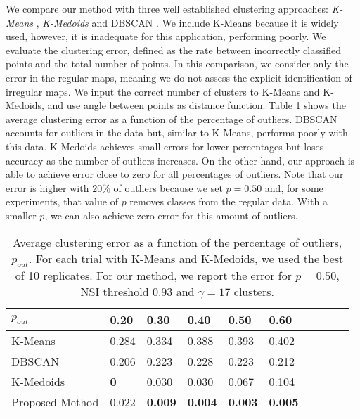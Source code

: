 We compare our method with three well established clustering approaches: \emph{K-Means} \cite{lloyd1982least}, \emph{K-Medoids} \cite{kaufman1987clustering} and DBSCAN \cite{ester1996density}. 
We include K-Means because it is widely used, however, it is inadequate for this application, performing poorly.
We evaluate the clustering error, defined as the rate between incorrectly classified points and the total number of points. In this comparison, we consider only the error in the regular maps, meaning we do not assess the explicit identification of irregular maps. 
We input the correct number of clusters to K-Means and K-Medoids, and use angle between points as distance function.
%
Table \ref{tab:ec} shows the average clustering error as a function of the percentage of outliers. DBSCAN accounts for outliers in the data but, similar to K-Means, performs poorly with this data. K-Medoids achieves small errors for lower percentages but loses accuracy as the number of outliers increases.
On the other hand, our approach is able to achieve error close to zero for all percentages of outliers. Note that our error is higher with $20\%$ of outliers because we set $p=0.50$ and, for some experiments, that value of $p$ removes classes from the regular data. With a smaller $p$, we can also achieve zero error for this amount of outliers.
%
\begin{table}[hbt]
\caption{Average clustering error as a function of the percentage of outliers, $p_{out}$. For each trial with K-Means and K-Medoids, we used the best of 10 replicates. For our method, we report the error for $p=0.50$, NSI threshold $0.93$ and $\gamma = 17$ clusters.}
\label{tab:ec}
\centering
\begin{tabular}{llllllllll}
\toprule
$p_{out}$& 0.20&0.30&0.40&0.50&0.60\\
\midrule
K-Means &0.284&0.334&0.388&0.393&0.402\\
DBSCAN&0.206&0.223&0.228&0.223&0.212\\
K-Medoids&\textbf{0}&0.030&0.030&0.067&0.104\\
Proposed Method  &0.022&\textbf{0.009}&\textbf{0.004}&\textbf{0.003}&\textbf{0.005}\\
\bottomrule
\end{tabular}
\end{table}


